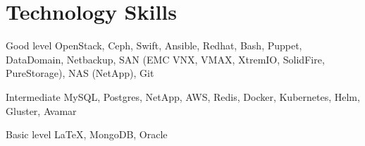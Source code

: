 \documentclass{tccv}
\begin{document}
\section{Technology Skills}

\begin{factlist}

\item{Good level}
     {OpenStack, Ceph, Swift, Ansible, Redhat, Bash, Puppet, DataDomain, Netbackup, SAN (EMC VNX, VMAX, XtremIO, SolidFire, PureStorage), NAS (NetApp), Git}

\item{Intermediate}
     {MySQL, Postgres, NetApp, AWS, Redis, Docker, Kubernetes, Helm, Gluster, Avamar}

\item{Basic level}
     {\LaTeX, MongoDB, Oracle}

\end{factlist}
\end{document}
